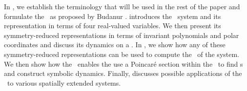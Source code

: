 In , we establish the terminology that will be used in the rest
of the paper and formulate the \mslices\ as proposed by Budanur \etal{}.
 introduces the \twoMode\ system and its representation
in terms of four real-valued variables. We then present its symmetry-reduced representations
in terms of invariant polynomials and polar coordinates and discuss its dynamics on a \slice. 
In , we show how any of these symmetry-reduced representations can be used
to compute the \reqva\ of the system. We then show how the \mslices\ enables the use a Poincar\'e section within the \slice\ to find  \rpo s and construct symbolic dynamics. Finally,  discusses possible applications of the \mslices\ to various spatially extended systems.
